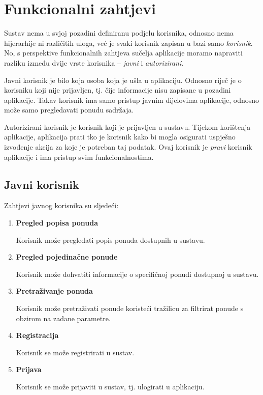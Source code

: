 \documentclass[times, utf8, zavrsni, numeric]{fer}
\newcommand{\razmakp}{\vspace{18pt}}
\newcommand{\razmaks}{\vspace{10pt}}
\newcommand{\uvlakas}{\hspace{0.5cm}}
\begin{document}
\razmakp


\section{Funkcionalni zahtjevi}

Sustav nema u svjoj pozadini definiranu podjelu korisnika, odnosno nema hijerarhije ni različitih uloga, već je svaki korisnik zapisan u bazi samo \emph{korisnik}. No, s perspektive funkcionalnih zahtjeva sučelja aplikacije moramo napraviti razliku između dvije vrste korisnika -- \emph{javni} i \emph{autorizirani}.

Javni korisnik je bilo koja osoba koja je ušla u aplikaciju. Odnosno riječ je o korisniku koji nije prijavljen, tj. čije informacije nisu zapisane u pozadini aplikacije. Takav korisnik ima samo pristup javnim dijelovima aplikacije, odnosno može samo pregledavati ponudu sadržaja. 

Autorizirani korisnik je korisnik koji je prijavljen u sustavu. Tijekom korištenja aplikacije, aplikacija prati tko je korisnik kako bi mogla osigurati uspješno izvođenje akcija za koje je potreban taj podatak. Ovaj korisnik je \emph{pravi} korisnik aplikacije i ima pristup svim funkcionalnostima.

\razmaks


\subsection{Javni korisnik}

Zahtjevi javnog korisnika su sljedeći:

\razmaks
\begin{enumerate} 
  \item \textbf{Pregled popisa ponuda} \par
    \uvlakas Korisnik može pregledati popis ponuda dostupnih u sustavu.

  \item \textbf{Pregled pojedinačne ponude} \par
    \uvlakas Korisnik može dohvatiti informacije o specifičnoj ponudi dostupnoj u sustavu.

  \item \textbf{Pretraživanje ponuda} \par
    \uvlakas Korisnik može pretraživati ponude koristeći tražilicu za filtrirat ponude s obzirom na zadane parametre.

  \item \textbf{Registracija} \par
    \uvlakas Korisnik se može registrirati  u sustav.

  \item \textbf{Prijava} \par
    \uvlakas Korisnik se može prijaviti u sustav, tj. ulogirati  u aplikaciju.

\end{enumerate}
\razmaks
\end{document}
